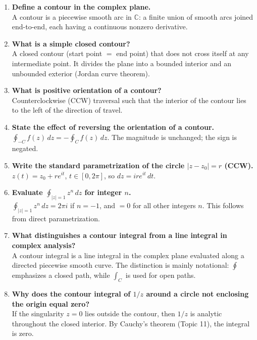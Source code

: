 \documentclass[12pt,a4paper]{article}
\begin{document}
\begin{enumerate}[leftmargin=2em]

\item \textbf{Define a contour in the complex plane.}\\
A contour is a piecewise smooth arc in $\mathbb{C}$: a finite union of smooth
arcs joined end-to-end, each having a continuous nonzero derivative.

\item \textbf{What is a simple closed contour?}\\
A closed contour (start point $=$ end point) that does not cross itself at any
intermediate point. It divides the plane into a bounded interior and an
unbounded exterior (Jordan curve theorem).

\item \textbf{What is positive orientation of a contour?}\\
Counterclockwise (CCW) traversal such that the interior of the contour lies to
the left of the direction of travel.

\item \textbf{State the effect of reversing the orientation of a contour.}\\
$\oint_{-C} f(z)\,dz = -\oint_C f(z)\,dz$. The magnitude is unchanged; the sign
is negated.

\item \textbf{Write the standard parametrization of the circle $|z - z_0| = r$ (CCW).}\\
$z(t) = z_0 + re^{it}$, $t \in [0, 2\pi]$, so $dz = ire^{it}\,dt$.

\item \textbf{Evaluate $\oint_{|z|=1} z^n\,dz$ for integer $n$.}\\
$\oint_{|z|=1} z^n\,dz = 2\pi i$ if $n = -1$, and $= 0$ for all other integers
$n$. This follows from direct parametrization.

\item \textbf{What distinguishes a contour integral from a line integral in complex analysis?}\\
A contour integral is a line integral in the complex plane evaluated along a
directed piecewise smooth curve. The distinction is mainly notational: $\oint$
emphasizes a closed path, while $\int_C$ is used for open paths.

\item \textbf{Why does the contour integral of $1/z$ around a circle not enclosing the origin equal zero?}\\
If the singularity $z=0$ lies outside the contour, then $1/z$ is analytic
throughout the closed interior. By Cauchy's theorem (Topic 11), the integral is
zero.

\end{enumerate}
\end{document}
